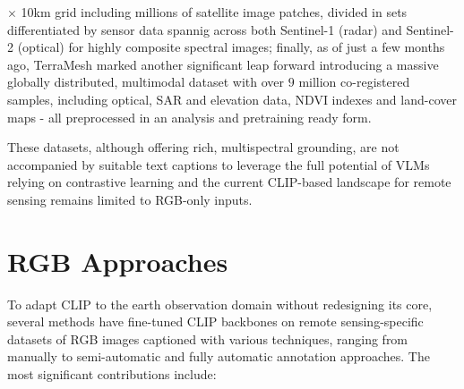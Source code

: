 \documentclass[a4paper, oneside, english]{sapthesis} %
\begin{document}
$\times$ 10km grid including millions of satellite image patches, divided in sets differentiated by sensor data spannig across both Sentinel-1 (radar) and Sentinel-2 (optical) for highly composite spectral images; finally, as of just a few months ago, TerraMesh \cite{blumenstiel2025terramesh} marked another significant leap forward introducing a massive globally distributed, multimodal dataset with over $9$ million co-registered samples, including optical, SAR and elevation data, NDVI indexes and land-cover maps - all preprocessed in an analysis and pretraining ready form.

These datasets, although offering rich, multispectral grounding, are not accompanied by suitable text captions to leverage the full potential of VLMs relying on contrastive learning and the current CLIP-based landscape for remote sensing remains limited to RGB-only inputs.


\section{RGB Approaches}

To adapt CLIP to the earth observation domain without redesigning its core, several methods have fine-tuned CLIP backbones on remote sensing-specific datasets of RGB images captioned with various techniques, ranging from manually to semi-automatic and fully automatic annotation approaches. The most significant contributions include:
\end{document}
